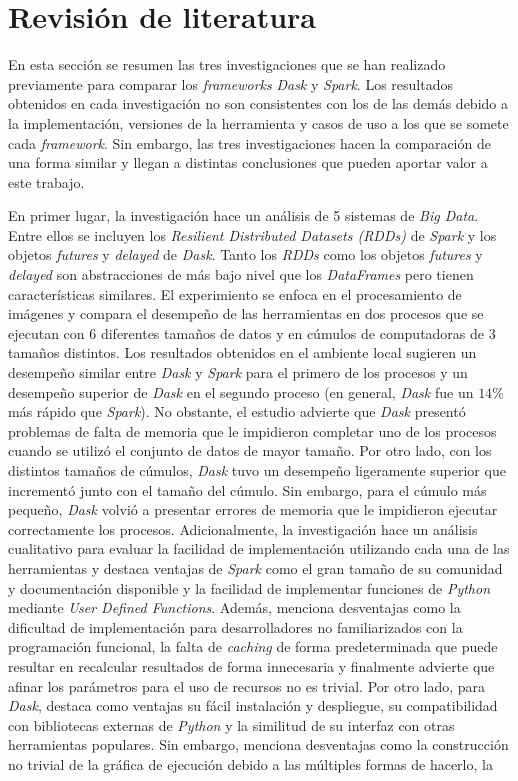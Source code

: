 \chapter{Revisión de literatura}

\noindent En esta sección se resumen las tres investigaciones que se han realizado previamente para comparar los \textit{frameworks} \textit{Dask} y \textit{Spark}. Los resultados obtenidos en cada investigación no son consistentes con los de las demás debido a la implementación, versiones de la herramienta y casos de uso a los que se somete cada \textit{framework}. Sin embargo, las tres investigaciones hacen la comparación de una forma similar y llegan a distintas conclusiones que pueden aportar valor a este trabajo.

En primer lugar, la investigación \cite{comparative-evolution} hace un análisis de 5 sistemas de \textit{Big Data}. Entre ellos se incluyen los \textit{Resilient Distributed Datasets (RDDs)} de \textit{Spark} y los objetos \textit{futures} y \textit{delayed} de \textit{Dask}. Tanto los \textit{RDDs} como los objetos \textit{futures} y \textit{delayed} son abstracciones de más bajo nivel que los \textit{DataFrames} pero tienen características similares. El experimiento se enfoca en el procesamiento de imágenes y compara el desempeño de las herramientas en dos procesos que se ejecutan con 6 diferentes tamaños de datos y en cúmulos de computadoras de 3 tamaños distintos. Los resultados obtenidos en el ambiente local sugieren un desempeño similar entre \textit{Dask} y \textit{Spark} para el primero de los procesos y un desempeño superior de \textit{Dask} en el segundo proceso (en general, \textit{Dask} fue un $14\%$ más rápido que \textit{Spark}). No obstante, el estudio advierte que \textit{Dask} presentó problemas de falta de memoria que le impidieron completar uno de los procesos cuando se utilizó el conjunto de datos de mayor tamaño. Por otro lado, con los distintos tamaños de cúmulos, \textit{Dask} tuvo un desempeño ligeramente superior que incrementó junto con el tamaño del cúmulo. Sin embargo, para el cúmulo más pequeño, \textit{Dask} volvió a presentar errores de memoria que le impidieron ejecutar correctamente los procesos. Adicionalmente, la investigación hace un análisis cualitativo para evaluar la facilidad de implementación utilizando cada una de las herramientas y destaca ventajas de \textit{Spark} como el gran tamaño de su comunidad y documentación disponible y la facilidad de implementar funciones de \textit{Python} mediante \textit{User Defined Functions}. Además, menciona desventajas como la dificultad de implementación para desarrolladores no familiarizados con la programación funcional, la falta de \textit{caching} de forma predeterminada que puede resultar en recalcular resultados de forma innecesaria y finalmente advierte que afinar los parámetros para el uso de recursos no es trivial. Por otro lado, para \textit{Dask}, destaca como ventajas su fácil instalación y despliegue, su compatibilidad con bibliotecas externas de \textit{Python} y la similitud de su interfaz con otras herramientas populares. Sin embargo, menciona desventajas como la construcción no trivial de la gráfica de ejecución debido a las múltiples formas de hacerlo, la 